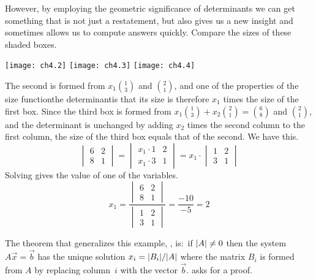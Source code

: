 However, by employing the geometric significance of determinants
we can get something that is not just a restatement, but also
gives us a new insight and sometimes allows us to compute 
answers quickly.
Compare the sizes of these shaded boxes.
\begin{center}
   \texttt{[image: ch4.2]}
   \hfil
   \texttt{[image: ch4.3]}
   \hfil
   \texttt{[image: ch4.4]}
\end{center}
The second is formed from $x_1\binom{1}{3}$ and $\binom{2}{1}$, and
one of the properties of the size function\Dash the determinant\Dash is 
that its size is therefore \( x_1 \) times the size of the 
first box.
Since the third box is formed from 
$x_1\binom{1}{3}+x_2\binom{2}{1}=\binom{6}{8}$ 
and $\binom{2}{1}$,
and the determinant is unchanged by adding $x_2$ 
times the second column to the first column,
the size of the third box equals that of the second.
We have this.
\begin{equation*}
  \begin{vmatrix}
     6  &2  \\
     8  &1
  \end{vmatrix}
  =
  \begin{vmatrix}
     x_1\cdot 1  &2  \\
     x_1\cdot 3  &1
  \end{vmatrix}
  =
  x_1\cdot \begin{vmatrix}
     1  &2  \\
     3  &1
  \end{vmatrix}
\end{equation*}
Solving gives the value of one of the variables.
\begin{equation*}
  x_1=
  \frac{\begin{vmatrix}
     6  &2  \\
     8  &1
  \end{vmatrix} }{
  \begin{vmatrix}
     1  &2  \\
     3  &1
  \end{vmatrix}  }
  =\frac{-10}{-5}=2
\end{equation*}

The theorem that generalizes this example, %
%
,
is:~if \( \deter{A}\neq 0 \) then the system \( A\vec{x}=\vec{b} \) has the
unique solution
$
   x_i=\deter{B_i}/\deter{A}
$
where the matrix $B_i$ is formed from $A$ by replacing column~$i$ 
with the vector \( \vec{b} \).
 asks for a proof.

